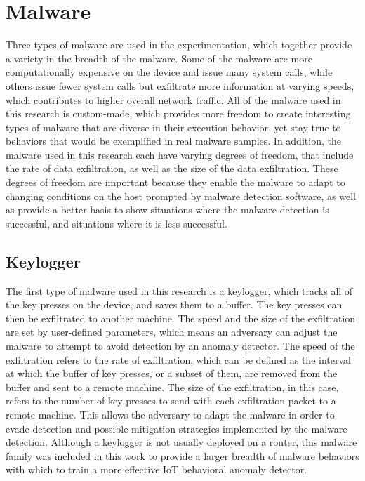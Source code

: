 \documentclass[runningheads]{llncs}
\begin{document}
\section{Malware}
Three types of malware are used in the experimentation, which together provide a variety in the breadth of the malware. Some of the malware are more computationally expensive on the device and issue many system calls, while others issue fewer system calls but exfiltrate more information at varying speeds, which contributes to higher overall network traffic. All of the malware used in this research is custom-made, which provides more freedom to create interesting types of malware that are diverse in their execution behavior, yet stay true to behaviors that would be exemplified in real malware samples. In addition, the malware used in this research each have varying degrees of freedom, that include the rate of data exfiltration, as well as the size of the data exfiltration. These degrees of freedom are important because they enable the malware to adapt to changing conditions on the host prompted by malware detection software, as well as provide a better basis to show situations where the malware detection is successful, and situations where it is less successful.

\subsection{Keylogger} 
The first type of malware used in this research is a keylogger, which tracks all of the key presses on the device, and saves them to a buffer. The key presses can then be exfiltrated to another machine. The speed and the size of the exfiltration are set by user-defined parameters, which means an adversary can adjust the malware to attempt to avoid detection by an anomaly detector. The speed of the exfiltration refers to the rate of exfiltration, which can be defined as the interval at which the buffer of key presses, or a subset of them, are removed from the buffer and sent to a remote machine. The size of the exfiltration, in this case, refers to the number of key presses to send with each exfiltration packet to a remote machine. This allows the adversary to adapt the malware in order to evade detection and possible mitigation strategies implemented by the malware detection. Although a keylogger is not usually deployed on a router, this malware family was included in this work to provide a larger breadth of malware behaviors with which to train a more effective IoT behavioral anomaly detector.
\end{document}
